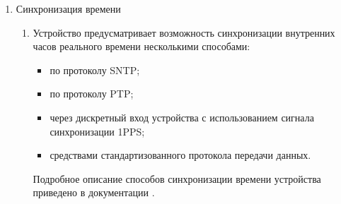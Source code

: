 \begin{enumerate}
\item Синхронизация времени
\begin{enumerate}
\item Устройство предусматривает возможность синхронизации внутренних часов реального времени несколькими способами:
\begin{itemize}
\item по протоколу SNTP;
\item по протоколу PTP;
\item через дискретный вход устройства с использованием сигнала синхронизации 1PPS;
\item средствами стандартизованного протокола передачи данных.
\end{itemize}
Подробное описание способов синхронизации времени устройства приведено в документации \ManualUnitGeneral.
\end{enumerate}


\end{enumerate}
